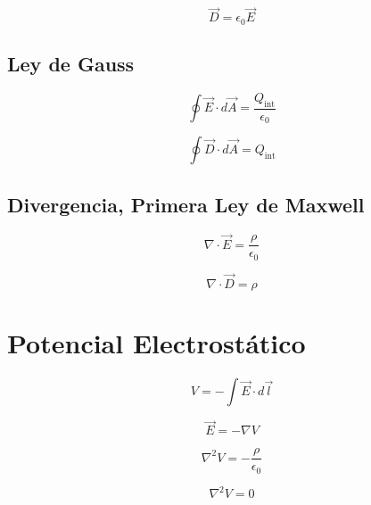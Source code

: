\documentclass[12pt,a4paper,twocolumn]{article}
\begin{document}
\begin{equation*}
    \vec{D} = \epsilon_0 \vec{E}
\end{equation*}

\subsection*{Ley de Gauss}

\begin{equation*}
    \oint \vec{E} \cdot d\vec{A} = \frac{Q_{\text{int}}}{\epsilon_0}
\end{equation*}

\begin{equation*}
    \oint \vec{D} \cdot d\vec{A} = Q_{\text{int}}
\end{equation*}

\subsection*{Divergencia, Primera Ley de Maxwell}

\begin{equation*}
    \nabla \cdot \vec{E} = \frac{\rho}{\epsilon_0}
\end{equation*}

\begin{equation*}
    \nabla \cdot \vec{D} = \rho
\end{equation*}

\section*{Potencial Electrostático}

\begin{equation*}
    V = -\int \vec{E} \cdot d\vec{l}
\end{equation*}

\begin{equation*}
    \vec{E} = -\nabla V
\end{equation*}

\begin{equation*}
    \nabla^2 V = -\frac{\rho}{\epsilon_0}
\end{equation*}

\begin{equation*}
    \nabla^2 V = 0
\end{equation*}
\end{document}
